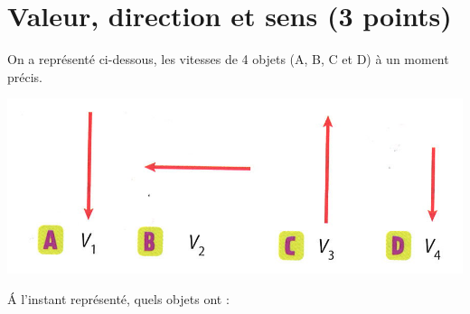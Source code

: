 \section{Valeur, direction et sens (3 points)}

On a représenté ci-dessous, les vitesses de 4 objets (A, B, C et D) à un moment précis.

\begin{center}
	\includegraphics[scale=0.4]{exemples}
\end{center}

\begin{questions}
	\question \'A l'instant représenté, quels objets ont :

\end{questions}